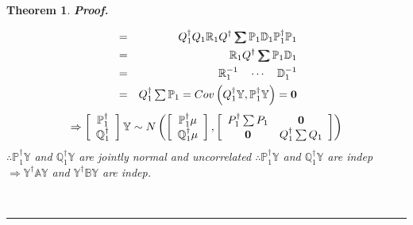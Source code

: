 \documentclass{article}
\newtheorem{theorem}{Theorem}
\newenvironment{proof}[1][Proof]{\noindent\textbf{#1.} }{\ \rule{0.5em}{0.5em}}
\begin{document}
\begin{theorem}
\begin{proof}
\begin{itemize}
\begin{eqnarray*}
&=&Q_{1}^{\dagger }Q_{1}\mathbb{R}_{1}Q^{\dagger }%
\tsum\mkern-20mu\tsum%
\mathbb{P}_{1}\mathbb{D}_{1}\mathbb{P}_{1}^{\dagger }\mathbb{P}_{1} \\
&=&\mathbb{R}_{1}Q^{\dagger }%
\tsum\mkern-20mu\tsum%
\mathbb{P}_{1}\mathbb{D}_{1} \\
&=&\mathbb{R}_{1}^{-1}\quad \cdots \quad \mathbb{D}_{1}^{-1} \\
&=&Q_{1}^{\dagger }\tsum \mathbb{P}_{1}=Cov\left( Q_{1}^{\dagger }\mathbb{Y},%
\mathbb{P}_{1}^{\dagger }\mathbb{Y}\right) =\boldsymbol{0}
\end{eqnarray*}%
\begin{equation*}
\Rightarrow \left[ 
\begin{array}{c}
\mathbb{P}_{1}^{\dagger } \\ 
\mathbb{Q}_{1}^{\dagger }%
\end{array}%
\right] \mathbb{Y}\sim N\left( \left[ 
\begin{array}{c}
\mathbb{P}_{1}^{\dagger }\mu \\ 
\mathbb{Q}_{1}^{\dagger }\mu%
\end{array}%
\right] ,\left[ 
\begin{array}{cc}
P_{1}^{\dagger }\tsum P_{1} & \boldsymbol{0} \\ 
\boldsymbol{0} & Q_{1}^{\dagger }\tsum Q_{1}%
\end{array}%
\right] \right)
\end{equation*}%
$\therefore \mathbb{P}_{1}^{\dagger }\mathbb{Y}$ and $\mathbb{Q}%
_{1}^{\dagger }\mathbb{Y}$ are jointly normal and uncorrelated\newline
\newline
$\therefore \mathbb{P}_{1}^{\dagger }\mathbb{Y}$ and $\mathbb{Q}%
_{1}^{\dagger }\mathbb{Y}$ are indep $\Rightarrow \mathbb{Y^{\dagger }AY}$
and $\mathbb{Y^{\dagger }BY}$ are indep.\newline
\newline


\end{itemize}
\end{proof}
\end{theorem}
\end{document}
